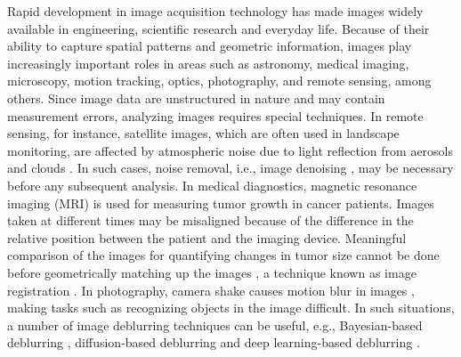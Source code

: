 Rapid development in image acquisition technology has made images widely available in engineering, scientific research and everyday life. Because of their ability to capture spatial patterns and geometric information, images play increasingly important roles in areas such as astronomy, medical imaging, microscopy, motion tracking, optics, photography, and remote sensing, among others. Since image data are unstructured in nature and may contain measurement errors, analyzing images requires special techniques. In remote sensing, for instance, satellite images, which are often used in landscape monitoring, are affected by atmospheric noise due to light reflection from aerosols and clouds \citep{boonprong2018classification}. In such cases, noise removal, i.e., image denoising \citep{buades2005review, polzehl2000adaptive}, may be necessary before any subsequent analysis. In medical diagnostics, magnetic resonance imaging (MRI) is used for measuring tumor growth in cancer patients. Images taken at different times may be misaligned because of the difference in the relative position between the patient and the imaging device. Meaningful comparison of the images for quantifying changes in tumor size cannot be done before geometrically matching up the images \citep{klein2009evaluation}, a technique known as image registration \citep{zitova2003image}. In photography, camera shake causes motion blur in images \citep{bai2018graph}, making tasks such as recognizing objects in the image difficult. In such situations, a number of image deblurring techniques can be useful, e.g., Bayesian-based deblurring \citep{wang2011analyzing}, diffusion-based deblurring \citep{yue2025efficient} and deep learning-based deblurring \citep{quan2025deep}.

